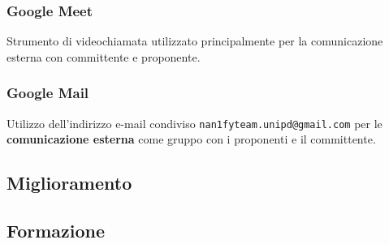 \subsubsection{Google Meet}
Strumento di videochiamata utilizzato principalmente per la comunicazione esterna con committente e proponente.

\subsubsection{Google Mail}
Utilizzo dell'indirizzo e-mail condiviso \texttt{nan1fyteam.unipd@gmail.com} per le \textbf{comunicazione esterna} come gruppo con i proponenti e il committente.

\subsection{Miglioramento}
\subsection{Formazione}